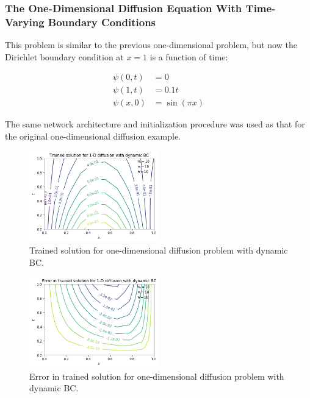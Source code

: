 \documentclass{article}
\begin{document}
\subsubsection{The One-Dimensional Diffusion Equation With Time-Varying Boundary Conditions}

This problem is similar to the previous one-dimensional problem, but now the Dirichlet boundary condition at $x=1$ is a function of time:

\begin{equation}
\begin{split}
  \psi(0,t) &= 0 \\
  \psi(1,t) &= 0.1 t\\
  \psi(x,0) &= \sin(\pi x)
\end{split}
\end{equation}


The same network architecture and initialization procedure was used as that for the original one-dimensional diffusion example.

\begin{figure}
    \centering
    \includegraphics[width=0.5\textwidth]{figures/diff1d_dynamicBC_trained.png}
    \caption{Trained solution for one-dimensional diffusion problem with dynamic BC.}
    \label{fig:diff1d_dynamicBC_trained}
\end{figure}

\begin{figure}
    \centering
    \includegraphics[width=0.5\textwidth]{figures/diff1d_dynamicBC_error.png}
    \caption{Error in trained solution for one-dimensional diffusion problem with dynamic BC.}
    \label{fig:diff1d_dynamicBC_error}
\end{figure}
\end{document}
